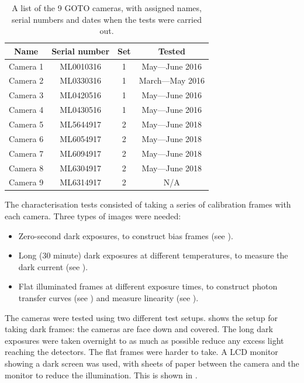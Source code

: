 \begin{colsection}
\begin{colsection}
\begin{table}[t]
    \begin{center}
        \begin{tabular}{c|ccc} %
            Name     & Serial number & Set & Tested \\
            \midrule
            Camera 1 & ML0010316     &   1 & May---June 2016  \\
            Camera 2 & ML0330316     &   1 & March---May 2016 \\
            Camera 3 & ML0420516     &   1 & May---June 2016  \\
            Camera 4 & ML0430516     &   1 & May---June 2016  \\
            Camera 5 & ML5644917     &   2 & May---June 2018  \\
            Camera 6 & ML6054917     &   2 & May---June 2018  \\
            Camera 7 & ML6094917     &   2 & May---June 2018  \\
            Camera 8 & ML6304917     &   2 & May---June 2018  \\
            Camera 9 & ML6314917     &   2 & N/A              \\
        \end{tabular}
    \end{center}
    \caption[List of GOTO cameras]{
        A list of the 9 GOTO cameras, with assigned names, serial numbers and dates when the tests were carried out.
    }\label{tab:cameras}
\end{table}

The characterisation tests consisted of taking a series of calibration frames with each camera. Three types of images were needed:

\begin{itemize}
    \item Zero-second dark exposures, to construct bias frames (see ).
    \item Long (30 minute) dark exposures at different temperatures, to measure the dark current (see ).
    \item Flat illuminated frames at different exposure times, to construct photon transfer curves (see ) and measure linearity (see ).
\end{itemize}

The cameras were tested using two different test setups.  shows the setup for taking dark frames: the cameras are face down and covered. The long dark exposures were taken overnight to as much as possible reduce any excess light reaching the detectors. The flat frames were harder to take. A LCD monitor showing a dark screen was used, with sheets of paper between the camera and the monitor to reduce the illumination. This is shown in .


\end{colsection}
\end{colsection}
